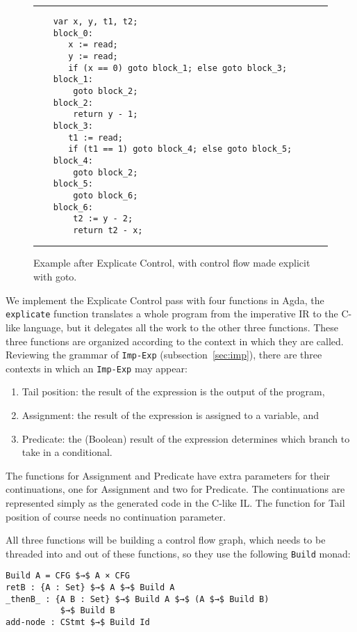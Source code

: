 \documentclass[sigplan,review,dvipsnames,screen,10pt]{acmart}
\begin{document}
\begin{figure}[tp]
  \hrule
\begin{lstlisting}
    var x, y, t1, t2;
    block_0:
       x := read;
       y := read;
       if (x == 0) goto block_1; else goto block_3;
    block_1:
        goto block_2;
    block_2:
        return y - 1;
    block_3:
       t1 := read;
       if (t1 == 1) goto block_4; else goto block_5;
    block_4:
        goto block_2;
    block_5:
        goto block_6;
    block_6:
        t2 := y - 2;
        return t2 - x;
\end{lstlisting}
  \hrule
  \caption{Example after Explicate Control, with control flow
    made explicit with goto.}
\label{fig:running-example-goto}
\end{figure}

We implement the Explicate Control pass with four functions in Agda,
the \lstinline{explicate} function translates a whole program from the
imperative IR to the C-like language, but it delegates all the work to
the other three functions. These three functions are organized
according to the context in which they are called. Reviewing the
grammar of \lstinline{Imp-Exp} (subsection~\ref{sec:imp}), there are
three contexts in which an \lstinline{Imp-Exp} may appear:
\begin{enumerate}
\item Tail position: the result of the expression is the output of the program,
\item Assignment: the result of the expression is assigned to a variable, and
\item Predicate: the (Boolean) result of the expression determines which
    branch to take in a conditional.
\end{enumerate}

The functions for Assignment and Predicate have extra parameters for
their continuations, one for Assignment and two for Predicate. The
continuations are represented simply as the generated code in the
C-like IL. The function for Tail position of course needs no
continuation parameter.

All three functions will be building a control flow graph, which needs
to be threaded into and out of these functions, so they use the
following \lstinline{Build} monad:

\begin{lstlisting}
Build A = CFG $→$ A × CFG
retB : {A : Set} $→$ A $→$ Build A
_thenB_ : {A B : Set} $→$ Build A $→$ (A $→$ Build B)
           $→$ Build B
add-node : CStmt $→$ Build Id
\end{lstlisting}
\end{document}
